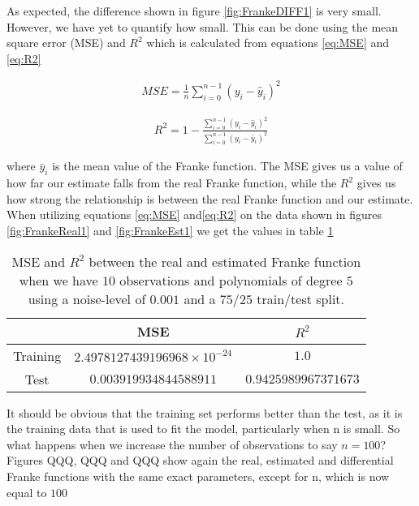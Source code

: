 \documentclass[12pt,a4paper]{article}
\begin{document}
\noindent As expected, the difference shown in figure \ref{fig:FrankeDIFF1} is very small. However, we have yet to quantify how small. This can be done using the mean square error (MSE) and $R^2$ which is calculated from equations \ref{eq:MSE} and \ref{eq:R2}

\begin{equation}\label{eq:MSE}
\begin{aligned}
MSE = \frac{1}{n} \sum_{i=0}^{n-1}(y_i-\hat{y}_i)^2
\end{aligned}
\end{equation}

\begin{equation}\label{eq:R2}
\begin{aligned}
R^2 = 1- \frac{\sum_{i=0}^{n-1}(y_i-\hat{y}_i)^2}{\sum_{i=0}^{n-1}(y_i-\bar{y}_i)^2}
\end{aligned}
\end{equation}

\noindent where $\bar{y}_i$ is the mean value of the Franke function. The MSE gives us a value of how far our estimate falls from the real Franke function, while the $R^2$ gives us how strong the relationship is between the real Franke function and our estimate. When utilizing equations \ref{eq:MSE} and\ref{eq:R2} on the data shown in figures \ref{fig:FrankeReal1} and \ref{fig:FrankeEst1} we get the values in table \ref{tab:ESTREAL1}

\begin{table}[h]
\caption{\label{tab:ESTREAL1} MSE and $R^2$ between the real and estimated Franke function when we have $10$ observations and polynomials of degree $5$ using a noise-level of $0.001$ and a $75/25$ train/test split.}
\centering
\begin{tabular}{c|c|c}
 & MSE & $R^2$\\
\hline
Training & $2.4978127439196968 \times 10^{-24}$ & $1.0$\\
\hline
Test & $0.003919934844588911$ & $0.9425989967371673$\\	  
\end{tabular}
\end{table}

\noindent It should be obvious that the training set performs better than the test, as it is the training data that is used to fit the model, particularly when n is small. So what happens when we increase the number of observations to say $n = 100$? Figures QQQ, QQQ and QQQ show again the real, estimated and differential Franke functions with the same exact parameters, except for n, which is now equal to $100$
\end{document}

